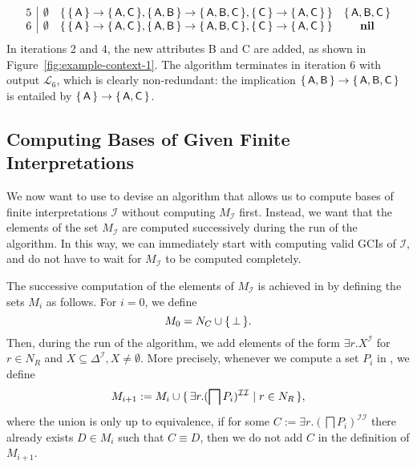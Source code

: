\begin{Example}
\begin{equation*}
\begin{array}{c|ccc}
      5 & \emptyset      & {\{\,{\{\,\mathsf{A}\,\}} \to {\ensuremath{\{\,\mathsf{A},\mathsf{C}\,\}}},
        {\{\,\mathsf{A},\mathsf{B}\,\}} \to {\ensuremath{\{\,\mathsf{A}, \mathsf{B}, \mathsf{C}\,\}}}, {\{\,\mathsf{C}\,\}} \to
        {\ensuremath{\{\,\mathsf{A},\mathsf{C}\,\}}}\,\}} & {\{\,\mathsf{A}, \mathsf{B}, \mathsf{C}\,\}}\\
      6 & \emptyset & {\{\,{\{\,\mathsf{A}\,\}} \to {\ensuremath{\{\,\mathsf{A},\mathsf{C}\,\}}},
        {\{\,\mathsf{A},\mathsf{B}\,\}} \to {\ensuremath{\{\,\mathsf{A}, \mathsf{B}, \mathsf{C}\,\}}}, {\{\,\mathsf{C}\,\}} \to
        {\ensuremath{\{\,\mathsf{A},\mathsf{C}\,\}}}\,\}} & \text{\textbf{nil}}
    \end{array}
  \end{equation*}
  In iterations 2 and 4, the new attributes B and C are added, as shown in
  Figure~\ref{fig:example-context-1}.  The algorithm terminates in iteration 6 with output
  $\mathcal{L}_6$, which is clearly non-redundant: the implication ${\{\,\mathsf{A},
    \mathsf{B}\,\}} \to {\ensuremath{\{\,\mathsf{A}, \mathsf{B}, \mathsf{C}\,\}}}$ is entailed by
  ${\{\,\mathsf{A}\,\}} \to {\ensuremath{\{\,\mathsf{A}, \mathsf{C}\,\}}}$.
\end{Example}

\subsection{Computing Bases of Given Finite Interpretations}
\label{sec:comp-bases-given}

We now want to use  to devise an algorithm that
allows us to compute bases of finite interpretations $\mathcal{I}$ without computing
$M_{\mathcal{I}}$ first.  Instead, we want that the elements of the set $M_{\mathcal{I}}$
are computed successively during the run of the algorithm.  In this way, we can
immediately start with computing valid GCIs of $\mathcal{I}$, and do not have to wait for
$M_{\mathcal{I}}$ to be computed completely.

The successive computation of the elements of $M_{\mathcal{I}}$ is achieved in
 by defining the sets $M_{i}$ as follows.  For $i
= 0$, we define
\begin{equation*}
  M_{0} = N_{C} \cup {\ensuremath{\{\, \bot \,\}}}.
\end{equation*}
Then, during the run of the algorithm, we add elements of the form $\exists
r. X^{\mathcal{I}}$ for $r \in N_{R}$ and $X \subseteq \Delta^{\mathcal{I}}, X \neq
\emptyset$.  More precisely, whenever we compute a set $P_{i}$ in
, we define
\begin{equation*}
  M_{i+1} := M_{i} \cup {\ensuremath{\{\, \exists r. (\bigsqcap P_{i})^{\mathcal{I}\mathcal{I}} \mid r
    \in N_{R} \,\}}},
\end{equation*}
where the union is only up to equivalence, \ie if for some $C:= \exists r. (\bigsqcap
P_{i})^{\mathcal{I}\mathcal{I}}$ there already exists $D \in M_{i}$ such that $C \equiv
D$, then we do not add $C$ in the definition of $M_{i+1}$.

